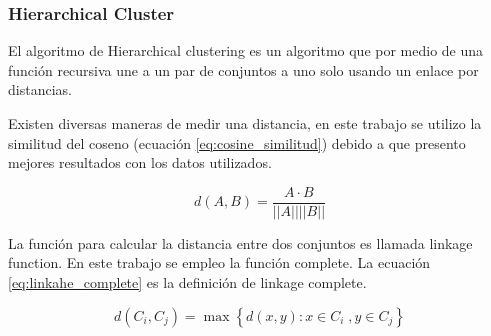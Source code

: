 \subsubsection{Hierarchical Cluster}

El algoritmo de Hierarchical clustering es un algoritmo que por medio de una función recursiva une a un par de conjuntos a uno solo usando un enlace por distancias.

Existen diversas maneras de medir una distancia, en este trabajo se utilizo la similitud del coseno (ecuación \ref{eq:cosine_similitud}) debido a que presento mejores resultados con los datos utilizados.

\begin{equation}
    d(A,B) = \frac{A\cdot B}{||A|| ||B||}
    \label{eq:cosine_similitud}
\end{equation}

La función para calcular la distancia entre dos conjuntos es llamada linkage function. En este trabajo se empleo la función complete. La ecuación \ref{eq:linkahe_complete} es la definición de linkage complete.

\begin{equation}
    d(C_i,C_j) = \max \left\lbrace d(x,y) : x\in C_i\;, y\in C_j \right\rbrace \label{eq:linkahe_complete}
\end{equation}



